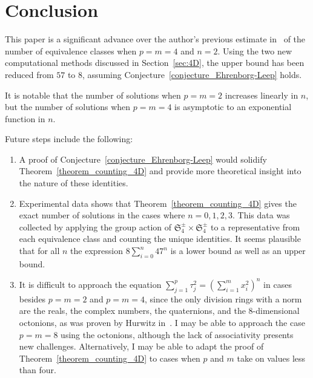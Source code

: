 \documentclass[12pt,table]{article}
\theoremstyle{definition}
\theoremstyle{remark}
\numberwithin{equation}{section}
\begin{document}
\section{Conclusion}



This paper is a significant advance
over the author's previous
estimate 
in~\cite{Ehrenborg_2018}
of the number of equivalence classes
when
$p = m = 4$ and $n=2$. Using the two
new computational methods discussed
in Section~\ref{sec:4D}, the upper bound
has been reduced from $57$ to $8$,
assuming Conjecture~\ref{conjecture_Ehrenborg-Leep}
holds.

It is notable that the number of solutions
when $p = m = 2$ increases linearly in
$n$, but the number of solutions
when $p = m = 4$
is asymptotic to an
exponential
function
in $n$.

Future steps include the following:
\begin{enumerate}
\item A proof of
Conjecture~\ref{conjecture_Ehrenborg-Leep}
would solidify Theorem~\ref{theorem_counting_4D}
and provide more theoretical insight
into the nature of these identities.
\item Experimental data shows that 
Theorem~\ref{theorem_counting_4D}
gives the exact number of solutions
in the cases where $n = 0, 1, 2, 3$.
This data was collected by applying the
group action of
$ \mathfrak{S}_4^\pm \times \mathfrak{S}_4^\pm $
to a representative from each equivalence
class and counting the unique identities.
It seems plausible that for all $n$
the expression  $ 8 \sum_{i = 0}^n{47^n} $ is
a lower bound as well as an upper bound.
\item It is difficult to approach the equation
$ \sum_{j = 1}^{p} \tau_j ^ 2 = \left( \sum_{i = 1}^{m} x_i ^ 2 \right) ^ n $
in cases besides $p = m = 2$ and $p = m = 4$, since
the only division rings with a norm are the reals, the complex
numbers, the quaternions, and the $8$-dimensional
octonions, as was proven by Hurwitz in~\cite{Hurwitz}.
I may be able to approach the case $p = m = 8$
using the octonions,
although the lack of associativity presents
new challenges.
Alternatively, I may be able to adapt
the proof of Theorem~\ref{theorem_counting_4D} to
cases when $p$ and $m$ take on values
less than four.
\end{enumerate}


\newcommand{\journal}[6]{{\sc #1,} #2, {\it #3} {\bf #4} (#5), #6.}
\newcommand{\preprint}[3]{{\sc #1,} #2, preprint #3.}
\newcommand{\book}[4]{{\sc #1,} #2, #3, #4.}
\newcommand{\collection}[6]{{\sc #1,}  #2, #3, in {\it #4}, #5, #6.}
\newcommand{\JCTA}{J.\ Combin.\ Theory Ser.\ A}
\newcommand{\arxiv}[3]{{\sc #1,} #2, {\tt #3}.}
\newcommand{\article}[3]{{\sc #1,} #2, {\tt #3}.}
\end{document}

